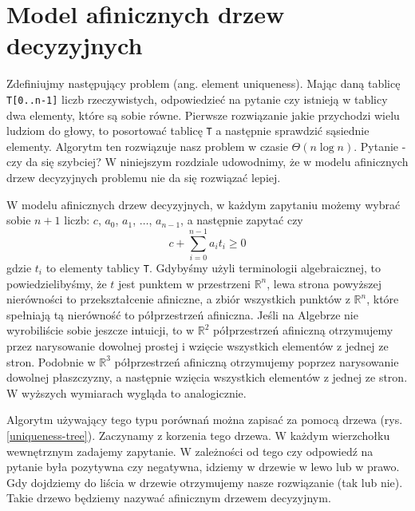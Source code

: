\section{Model afinicznych drzew decyzyjnych}

\label{sec:elementuniqueness}

Zdefiniujmy następujący problem (ang. element uniqueness).
Mając daną tablicę \texttt{T[0..n-1]} liczb rzeczywistych, odpowiedzieć na pytanie czy istnieją w tablicy dwa elementy, które są sobie równe.
Pierwsze rozwiązanie jakie przychodzi wielu ludziom do głowy, to posortować tablicę \texttt{T} a następnie sprawdzić sąsiednie elementy.
Algorytm ten rozwiązuje nasz problem w czasie $\Theta(n \log n)$.
Pytanie - czy da się szybciej?
W niniejszym rozdziale udowodnimy, że w modelu afinicznych drzew decyzyjnych problemu nie da się rozwiązać lepiej.

W modelu afinicznych drzew decyzyjnych, w każdym zapytaniu możemy wybrać sobie $n+1$ liczb: $c$, $a_0$, $a_1$, $\dots$, $a_{n-1}$, a następnie zapytać czy
\[
 c + \sum_{i=0}^{n-1} a_i t_i \geq 0
\]
gdzie $t_i$ to elementy tablicy \texttt{T}.
Gdybyśmy użyli terminologii algebraicznej, to powiedzielibyśmy, że $t$ jest punktem w przestrzeni $\mathbb{R}^n$, lewa strona powyższej nierówności to przekształcenie afiniczne,
a zbiór wszystkich punktów z $\mathbb{R}^n$, które spełniają tą nierówność to półprzestrzeń afiniczna.
Jeśli na Algebrze nie wyrobiliście sobie jeszcze intuicji, to w $\mathbb{R}^2$ półprzestrzeń afiniczną otrzymujemy przez narysowanie dowolnej prostej i wzięcie wszystkich elementów z jednej ze stron.
Podobnie w $\mathbb{R}^3$ półprzestrzeń afiniczną otrzymujemy poprzez narysowanie dowolnej płaszczyzny, a następnie wzięcia wszystkich elementów z jednej ze stron.
W wyższych wymiarach wygląda to analogicznie.

Algorytm używający tego typu porównań można zapisać za pomocą drzewa (rys. \ref{uniqueness-tree}).
Zaczynamy z korzenia tego drzewa.
W każdym wierzchołku wewnętrznym zadajemy zapytanie.
W zależności od tego czy odpowiedź na pytanie była pozytywna czy negatywna, idziemy w drzewie w lewo lub w prawo.
Gdy dojdziemy do liścia w drzewie otrzymujemy nasze rozwiązanie (tak lub nie).
Takie drzewo będziemy nazywać afinicznym drzewem decyzyjnym.

